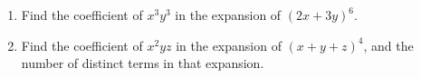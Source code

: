 \begin{enumerate}
\item[(a)] Find the coefficient of $x^3y^3$ in the expansion of $(2x+3y)^6$.
\item[(b)] Find the coefficient of $x^2yz$ in the expansion of $(x+y+z)^4$, and the number of distinct terms in that expansion.
\end{enumerate}
